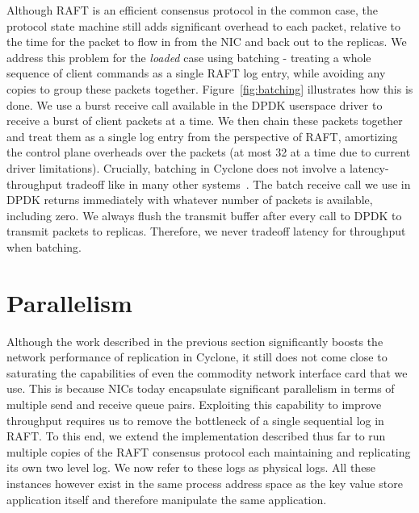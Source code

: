 \documentclass[pageno]{jpaper}
\begin{document}
Although RAFT is an efficient consensus protocol in the common case, the
protocol state machine still adds significant overhead to each packet, relative
to the time for the packet to flow in from the NIC and back out to the replicas.
We address this problem for the \emph{loaded} case using batching - treating a
whole sequence of client commands as a single RAFT log entry, while avoiding any
copies to group these packets together. Figure~\ref{fig:batching} illustrates
how this is done. We use a burst receive call available in the DPDK userspace
driver to receive a burst of client packets at a time. We then chain these
packets together and treat them as a single log entry from the perspective of
RAFT, amortizing the control plane overheads over the packets (at most 32 at a
time due to current driver limitations). Crucially, batching in Cyclone does not
involve a latency-throughput tradeoff like in many other
systems~\cite{ix-dataplane}. The batch receive call we use in DPDK returns
immediately with whatever number of packets is available, including zero. We
always flush the transmit buffer after every call to DPDK to transmit packets to
replicas. Therefore, we never tradeoff latency for throughput when batching. 



\section{Parallelism}
\label{sec:parallelism}


Although the work described in the previous section significantly boosts the
network performance of replication in Cyclone, it still does not come close to
saturating the capabilities of even the commodity network interface card that we
use. This is because NICs today encapsulate significant parallelism in terms of
multiple send and receive queue pairs. Exploiting this capability to improve
throughput requires us to remove the bottleneck of a single sequential log in
RAFT. To this end, we extend the implementation described thus far to run
multiple copies of the RAFT consensus protocol each maintaining and replicating
its own two level log. We now refer to these logs as physical logs. All these
instances however exist in the same process address space as the key value store
application itself and therefore manipulate the same application.
\end{document}

